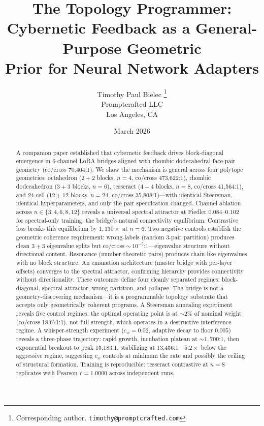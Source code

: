 \documentclass[11pt]{article}
\title{%
  The Topology Programmer:\\
  Cybernetic Feedback as a General-Purpose Geometric\\
  Prior for Neural Network Adapters%
}
\author{%
  Timothy Paul Bielec%
  \thanks{Corresponding author. \texttt{timothy@promptcrafted.com}}%
  \\
  Promptcrafted LLC\\
  Los Angeles, CA
}
\date{March 2026}
\begin{document}
\maketitle

\begin{abstract}
A companion paper established that cybernetic feedback drives
block-diagonal emergence in 6-channel LoRA bridges aligned with
rhombic dodecahedral face-pair geometry (co/cross 70{,}404:1). We show
the mechanism is general across four polytope geometries: octahedron
($2{+}2$ blocks, $n{=}4$, co/cross 473{,}622:1), rhombic dodecahedron
($3{+}3$ blocks, $n{=}6$), tesseract ($4{+}4$ blocks, $n{=}8$, co/cross
41{,}564:1), and 24-cell ($12{+}12$ blocks, $n{=}24$, co/cross
35{,}808:1)---with identical Steersman, identical hyperparameters, and
only the pair specification changed. Channel ablation across
$n \in \{3, 4, 6, 8, 12\}$ reveals a universal spectral attractor at
Fiedler $0.084$--$0.102$ for spectral-only training: the bridge's
natural connectivity equilibrium. Contrastive loss breaks this
equilibrium by $1{,}130\times$ at $n{=}6$. Two negative controls
establish the geometric coherence requirement: wrong-labels (random
3-pair partition) produces clean $3{+}3$ eigenvalue splits but co/cross
${\sim}\,10^{-5}$:1---eigenvalue structure without directional content.
Resonance (number-theoretic pairs) produces chain-like eigenvalues with
no block structure. An emanation architecture (master bridge with
per-layer offsets) converges to the spectral attractor, confirming
hierarchy provides connectivity without directionality. These outcomes
define four cleanly separated regimes: block-diagonal, spectral
attractor, wrong-partition, and collapse. The bridge is not a
geometry-discovering mechanism---it is a programmable topology substrate
that accepts only geometrically coherent programs. A Steersman annealing
experiment reveals five control regimes: the optimal operating point is
at ${\sim}2\%$ of nominal weight (co/cross 18{,}671:1), not full
strength, which operates in a destructive interference regime. A
whisper-strength experiment ($c_w = 0.02$, adaptive decay to floor
$0.005$) reveals a three-phase trajectory: rapid growth, incubation
plateau at ${\sim}1{,}700$:1, then exponential breakout to peak
15{,}183:1, stabilizing at 13{,}456:1---$5.2\times$ below the
aggressive regime, suggesting $c_w$ controls at minimum the rate and
possibly the ceiling of structural formation. Training is reproducible:
tesseract contrastive at $n{=}8$ replicates with Pearson $r = 1.0000$
across independent runs.
\end{abstract}
\end{document}
